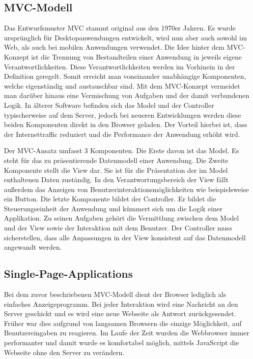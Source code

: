 \subsection{MVC-Modell}\label{MVC}
Das Entwurfsmuster MVC stammt original aus den 1970er Jahren. Es wurde ursprünglich für Desktopanwendungen entwickelt, wird nun aber auch sowohl im Web, als auch bei mobilen Anwendungen verwendet. Die Idee hinter dem MVC-Konzept ist die Trennung von Bestandteilen einer Anwendung in jeweils eigene Verantwortlichkeiten. Diese Verantwortlichkeiten werden im Vorhinein in der Definition geregelt. Somit erreicht man voneinander unabhängige Komponenten, welche eigenständig und austauschbar sind. Mit dem MVC-Konzept vermeidet man darüber hinaus eine Vermischung von Aufgaben und der damit verbundenen Logik. In älterer Software befinden sich das Model und der Controller typischerweise auf dem Server, jedoch bei neueren Entwicklungen werden diese beiden Komponenten direkt in den Browser geladen. Der Vorteil hierbei ist, dass der Internettraffic reduziert und die Performance der Anwendung erhöht wird.\autocites[vgl.][7\psqq]{Steyer2017}

Der MVC-Ansatz umfasst 3 Komponenten. Die Erste davon ist das Model. Es steht für das zu präsentierende Datenmodell einer Anwendung. Die Zweite Komponente stellt die View dar. Sie ist für die Präsentation der im Model enthaltenen Daten zuständig. In den Verantwortungsbereich der View fällt außerdem das Anzeigen von Benutzerinteraktionsmöglichkeiten wie beispielsweise ein Button. Die letzte Komponente bildet der Controller. Er bildet die Steuerungseinheit der Anwendung und kümmert sich um die Logik einer Applikation. Zu seinen Aufgaben gehört die Vermittlung zwischen dem Model und der View sowie der Interaktion mit dem Benutzer. Der Controller muss sicherstellen, dass alle Anpassungen in der View konsistent auf das Datenmodell angewandt werden.\autocites[vgl.][7\psqq]{Magnucki2017}

\subsection{Single-Page-Applications}

Bei dem zuvor beschriebenen MVC-Modell dient der Browser lediglich als einfaches Anzeigeprogramm. Bei jeder Interaktion wird eine Nachricht an den Server geschickt und es wird eine neue Webseite als Antwort zurückgesendet. Früher war dies aufgrund von langsamen Browsern die einzige Möglichkeit, auf Benutzereingaben zu reagieren. Im Laufe der Zeit wurden die Webbrowser immer performanter und damit wurde es komfortabel möglich, mittels JavaScript die Webseite ohne den Server zu verändern. 

